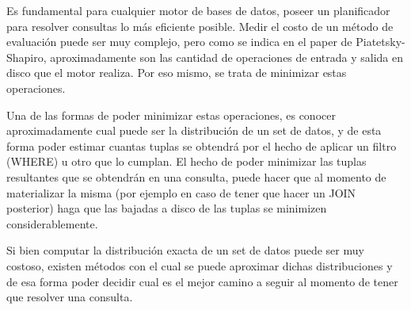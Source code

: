 \quad Es fundamental para cualquier motor de bases de datos, poseer un planificador para resolver consultas lo m\'as eficiente posible. Medir el costo de un m\'etodo de evaluaci\'on puede ser muy complejo, pero como se indica en el paper de Piatetsky-Shapiro, aproximadamente son las cantidad de operaciones de entrada y salida en disco que el motor realiza. Por eso mismo, se trata de minimizar estas operaciones.


\quad Una de las formas de poder minimizar estas operaciones, es conocer aproximadamente cual puede ser la distribuci\'on de un set de datos, y de esta forma poder estimar cuantas tuplas se obtendr\'a por el hecho de aplicar un filtro (WHERE) u otro que lo cumplan. El hecho de poder minimizar las tuplas resultantes que se obtendr\'an en una consulta, puede hacer que al momento de materializar la misma (por ejemplo en caso de tener que hacer un JOIN posterior) haga que las bajadas a disco de las tuplas se minimizen considerablemente.


\quad Si bien computar la distribuci\'on exacta de un set de datos puede ser muy costoso, existen m\'etodos con el cual se puede aproximar dichas distribuciones y de esa forma poder decidir cual es el mejor camino a seguir al momento de tener que resolver una consulta.


